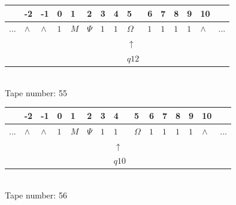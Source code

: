 \documentclass[11pt]{article}
\begin{document}
\begin{table}[H]
\centering
\begin{tabular}{lllllllllllllll}
 & -2 & -1 & 0 & 1 & 2 & 3 & 4 & 5 & 6 & 7 & 8 & 9 & 10 & \\
\hline
$...$ & \multicolumn{1}{|l|}{$\wedge$} & \multicolumn{1}{|l|}{$\wedge$} & \multicolumn{1}{|l|}{$1$} & \multicolumn{1}{|l|}{$M$} & \multicolumn{1}{|l|}{$\Psi$} & \multicolumn{1}{|l|}{$1$} & \multicolumn{1}{|l|}{$1$} & \multicolumn{1}{|l|}{$\Omega$} & \multicolumn{1}{|l|}{$1$} & \multicolumn{1}{|l|}{$1$} & \multicolumn{1}{|l|}{$1$} & \multicolumn{1}{|l|}{$1$} & \multicolumn{1}{|l|}{$\wedge$} & $...$\\
\hline
&  &  &  &  &  &  &  & $\uparrow$ &  &  &  &  &  &  \\
&  &  &  &  &  &  &  & $ q12 $ &  &  &  &  &  &  \\
\end{tabular}
\\
Tape number: 55
\noindent\makebox[\linewidth]{\hdashrule{\textwidth}{1pt}{1pt}}\end{table}

\begin{table}[H]
\centering
\begin{tabular}{lllllllllllllll}
 & -2 & -1 & 0 & 1 & 2 & 3 & 4 & 5 & 6 & 7 & 8 & 9 & 10 & \\
\hline
$...$ & \multicolumn{1}{|l|}{$\wedge$} & \multicolumn{1}{|l|}{$\wedge$} & \multicolumn{1}{|l|}{$1$} & \multicolumn{1}{|l|}{$M$} & \multicolumn{1}{|l|}{$\Psi$} & \multicolumn{1}{|l|}{$1$} & \multicolumn{1}{|l|}{$1$} & \multicolumn{1}{|l|}{$\Omega$} & \multicolumn{1}{|l|}{$1$} & \multicolumn{1}{|l|}{$1$} & \multicolumn{1}{|l|}{$1$} & \multicolumn{1}{|l|}{$1$} & \multicolumn{1}{|l|}{$\wedge$} & $...$\\
\hline
&  &  &  &  &  &  & $\uparrow$ &  &  &  &  &  &  &  \\
&  &  &  &  &  &  & $ q10 $ &  &  &  &  &  &  &  \\
\end{tabular}
\\
Tape number: 56
\noindent\makebox[\linewidth]{\hdashrule{\textwidth}{1pt}{1pt}}\end{table}
\end{document}
